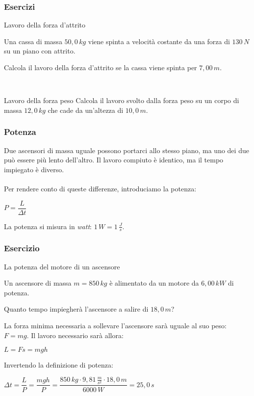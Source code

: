 \documentclass[]{beamer}
\theoremstyle{plain}
\begin{document}
\begin{frame}
\frametitle{Esercizi}
\begin{exampleblock}{Lavoro della forza d'attrito}
{\small Una cassa di massa $ 50,0 \, kg $ viene spinta a velocità costante da una forza di $ 130 \, N $ su un piano con attrito.

Calcola il lavoro della forza d'attrito se la cassa viene spinta per $ 7,00 \, m $.}
\end{exampleblock}

~

\begin{exampleblock}{Lavoro della forza peso}
{\small Calcola il lavoro svolto dalla forza peso su un corpo di massa $ 12,0 \, kg $ che cade da un'altezza di $ 10,0 \, m $.}
\end{exampleblock}
\end{frame}



\begin{frame}
  \frametitle{Potenza}
  Due ascensori di massa uguale possono portarci allo stesso piano, ma uno dei due può essere più lento dell'altro. Il lavoro compiuto è identico, ma il tempo impiegato è diverso.\\~\pause\\ Per rendere conto di queste differenze, introduciamo la \alert{potenza}:
  \begin{center}
\colorbox{marroncino!30}{$ P = \dfrac{L}{\Delta t} $}
\end{center}
La potenza si misura in \emph{watt}: $ 1 \, W = 1 \, \frac{J}{s} $.
\end{frame}




\begin{frame}
  \frametitle{Esercizio}
  \begin{exampleblock}{La potenza del motore di un ascensore}
{\small Un ascensore di massa $ m =  850 \, kg $ è alimentato da un motore da $ 6,00 \, kW $ di potenza. 

Quanto tempo impiegherà l'ascensore a salire di $ 18,0 \, m $?}
\end{exampleblock}
  \pause
  La forza minima necessaria a sollevare l'ascensore sarà uguale al suo peso: $ F = mg $. Il lavoro necessario sarà allora:
  \begin{center}
  $ L = Fs = mgh $
  \end{center}\pause
  Invertendo la definizione di potenza:
  \begin{center}
  $ \Delta t = \dfrac{L}{P} = \dfrac{mgh}{P} = \dfrac{850 \, kg \cdot 9,81 \, \frac{m}{s^2}\cdot 18,0 \, m }{6000 \, W} = 25,0 \, s $
  \end{center}
\end{frame}
\end{document}
